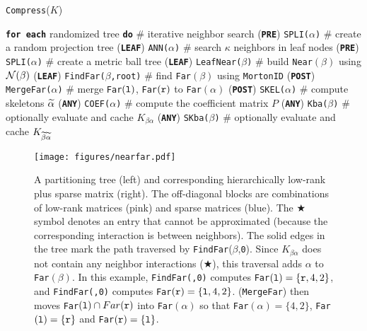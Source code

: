 \begin{algorithm}[!t]
\caption{{} \texttt{Compress}($K$)}
\begin{algorithmic}[1]
  \STATE \texttt{\bf for each} randomized tree \texttt{\bf do} \# iterative neighbor search
  \STATE \gap (\texttt{\bf PRE}) \texttt{SPLI($\alpha$)} \# create a random projection tree 
  \STATE \gap (\texttt{\bf LEAF}) \texttt{ANN($\alpha$)} \# search $\kappa$ neighbors in leaf nodes
  \STATE (\texttt{\bf PRE}) \texttt{SPLI($\alpha$)} \# create a metric ball tree 
  \STATE (\texttt{\bf LEAF}) \texttt{LeafNear($\beta$)} \# build \texttt{Near}$(\beta)$ using ${\mathcal N}(\beta)$
  \STATE (\texttt{\bf LEAF}) \texttt{FindFar($\beta$,root)} \# find \texttt{Far}$(\beta)$ using \texttt{MortonID}
  \STATE (\texttt{\bf POST}) \texttt{MergeFar($\alpha$)} \# merge \texttt{Far}$({\tt l})$, \texttt{Far}$({\tt r})$ to \texttt{Far}$(\alpha)$
  \STATE (\texttt{\bf POST}) \texttt{SKEL($\alpha$)} \# compute skeletons ${\widetilde{\alpha}}$
  \STATE (\texttt{\bf ANY}) \texttt{COEF($\alpha$)} \# compute the coefficient matrix $P$
  \STATE (\texttt{\bf ANY}) \texttt{Kba($\beta$)} \# optionally evaluate and cache $K_{\beta\alpha}$ 
  \STATE (\texttt{\bf ANY}) \texttt{SKba($\beta$)} \# optionally evaluate and cache $K_{{\widetilde{\beta}}{\widetilde{\alpha}}}$
\end{algorithmic}
\label{a:compress}
\end{algorithm}


\begin{figure}[h]
  \centering
  \texttt{[image: figures/nearfar.pdf]}
  \caption{A partitioning tree (left) and corresponding hierarchically
    low-rank plus sparse matrix (right).
    The off-diagonal blocks are combinations of low-rank matrices (pink)
    and sparse matrices (blue).
    The $\bigstar$ symbol denotes an entry that cannot
    be approximated (because the corresponding interaction is between neighbors).
    The solid edges in the tree mark the path traversed by
    \texttt{FindFar}($\beta$,\texttt{0}).
    Since $K_{\beta\alpha}$ does not contain any neighbor interactions ($\bigstar$),
    this traversal adds $\alpha$ to \texttt{Far}$(\beta)$.
    In this example,
    \texttt{FindFar(\lc,0)} computes \texttt{Far}$({\tt l})=\{{\tt r},4,2\}$, and
    \texttt{FindFar(\rc,0)} computes \texttt{Far}$({\tt r})=\{{\tt l},4,2\}$.
     (\texttt{MergeFar}) then moves \texttt{Far}$({\tt l}) \cap Far({\tt r})$
    into \texttt{Far}$(\alpha)$ so that
    \texttt{Far}$(\alpha)=\{4,2\}$, 
    \texttt{Far}$({\tt l})=\{{\tt r}\}$ and
    \texttt{Far}$({\tt r})=\{{\tt l}\}$.
  }
  \label{fig:tree}
\end{figure}


